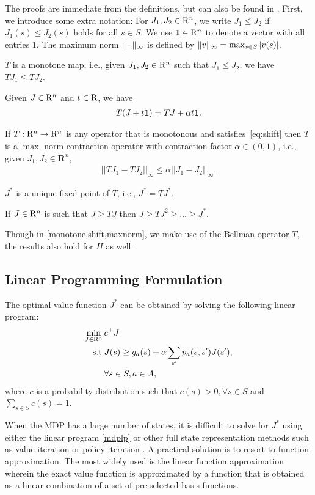 The proofs are immediate from the definitions, but can also be found in \cite{BertB}.
First, we introduce some extra notation:
For $J_1,J_2\in \mathrm{R}^n$, we write $J_1\le J_2$ if $J_1(s)\le J_2(s)$ holds for all $s\in S$.
We use $\mathbf{1} \in \mathrm{R}^n$ to denote a vector with all entries $1$.
The maximum norm $\|\cdot\|_{\infty}$ is defined by $ \|v\|_{\infty} = \max_{s\in S} |v(s)|$.
\begin{lemma}\label{monotone}
$T$ is a monotone map, i.e., given $J_1,J_2 \in \mathrm{R}^n$ such that $J_1\leq J_2$, we have $T J_1\leq T J_2$. 
\end{lemma}
\begin{lemma}\label{shift}
Given $J\in \mathrm{R}^n$ and $t \in \mathrm{R}$, we have
\begin{align}\label{eq:shift}
T(J+t\one)=TJ+\alpha t\one.
\end{align}
\end{lemma}
\begin{lemma}\label{maxnorm}
If $T: \mathrm{R}^n \to \mathrm{R}^n$ is any operator that is monotonous and satisfies~\eqref{eq:shift} then 
$T$ is a $\max$-norm contraction operator with contraction factor $\alpha \in (0,1)$, i.e., given $J_1, J_2 \in \mathbf{R}^n$,
\begin{align}
||TJ_1-TJ_2||_\infty\leq \alpha ||J_1-J_2||_\infty.
\end{align}
\end{lemma}
\begin{lemma}\label{uniquesol} 
$J^*$ is a unique fixed point of $T$, i.e., $J^*=TJ^*$.
\end{lemma}
\begin{corollary}
If $J\in \mathrm{R}^n$ is such that $J\geq TJ$ then $J\geq TJ^2\geq \ldots \geq J^*$.
\end{corollary}
Though in \cref{monotone,shift,maxnorm}, we make use of the Bellman operator $T$, the results also hold for $H$ as well.
\subsection{Linear Programming Formulation}
The optimal value function $J^*$ can be obtained by solving the following linear program:
\begin{align}\label{mdplp}
\min_{J\in \R^n}\, &c^\top J\\
\text{s.t.}\mb &J(s)\geq g_a(s)+\alpha\sum_{s'}p_a(s,s')J(s'),\nn\\
&\forall s \in S, a \in A,
\end{align}
where $c$ is a probability distribution such that $c(s)>0, \forall s \in S$ and $\sum_{s\in S}c(s)=1$.\par
When the MDP has a large number of states, it is difficult to solve for $J^*$ using either the linear program \eqref{mdplp} or other full state representation methods such as value iteration or policy iteration \cite{BertB}. A practical solution is to resort to function approximation. The most widely used is the linear function approximation wherein the exact value function is approximated by a function that is obtained as a linear combination of a set of pre-selected basis functions.
